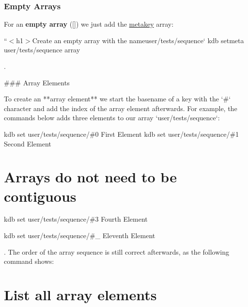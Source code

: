 \subsubsection*{Empty Arrays}

For an {\bfseries empty array} ({\ttfamily \mbox{[}\mbox{]}}) we just add the \hyperlink{md_doc_help_elektra-metadata_doc_help_elektra-metadata_md}{metakey} {\ttfamily array}\+:

``{\ttfamily  $<$h1$>$Create an empty array with the name}user/tests/sequence` kdb setmeta user/tests/sequence array \textquotesingle{}\textquotesingle{} 
\begin{DoxyCode}
.

### Array Elements

To create an **array element** we start the basename of a key with the `#` character and add the index of
       the array element afterwards. For example, the commands below adds three elements to our array
       `user/tests/sequence`:
\end{DoxyCode}
 kdb set user/tests/sequence/\#0 \textquotesingle{}First Element\textquotesingle{} kdb set user/tests/sequence/\#1 \textquotesingle{}Second Element\textquotesingle{} \section*{Arrays do not need to be contiguous}

kdb set user/tests/sequence/\#3 \textquotesingle{}Fourth Element\textquotesingle{} 
 kdb set user/tests/sequence/\#\+\_ \textquotesingle{}Eleventh Element\textquotesingle{} 
\begin{DoxyCode}
. The order of the array sequence is still correct afterwards, as the following command shows:
\end{DoxyCode}
 \section*{List all array elements}

